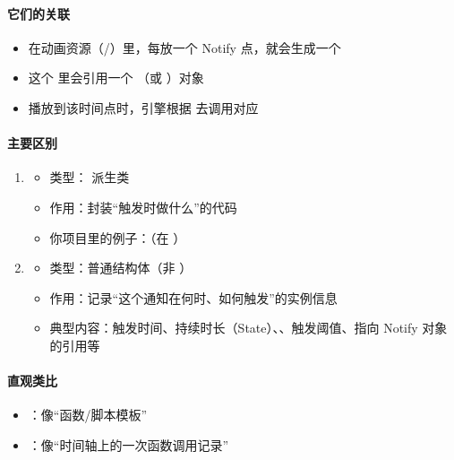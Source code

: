 \paragraph{它们的关联}

\begin{itemize}
	\item 在动画资源（/）里，每放一个 Notify 点，就会生成一个 
	\item 这个  里会引用一个 （或 ）对象
	\item 播放到该时间点时，引擎根据  去调用对应 
\end{itemize}

\paragraph{主要区别}

\begin{enumerate}
	\item {}
	
	\begin{itemize}
		\item 类型： 派生类
		\item 作用：封装“触发时做什么”的代码
		\item 你项目里的例子：（在 ）
	\end{itemize}
	
	\item {}
	
	\begin{itemize}
		\item 类型：普通结构体（非 ）
		\item 作用：记录“这个通知在何时、如何触发”的实例信息
		\item 典型内容：触发时间、持续时长（State）、、触发阈值、指向 Notify 对象的引用等
	\end{itemize}
\end{enumerate}

\paragraph{直观类比}

\begin{itemize}
	\item {}：像“函数/脚本模板”
	\item {}：像“时间轴上的一次函数调用记录”
\end{itemize}

